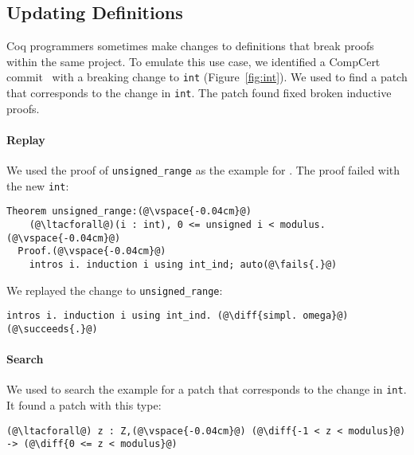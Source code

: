 \subsection{Updating Definitions}
\label{sec:compcert}

Coq programmers sometimes make changes to definitions that break proofs
within the same project. To emulate this use case, 
we identified a CompCert commit~\cite{compcertcommit}
with a breaking change to \lstinline{int} (Figure~\ref{fig:int}). %
We used \sysname to find a patch that corresponds to the change in \lstinline{int}.
The patch \sysname found fixed broken inductive proofs.

\paragraph{Replay} We used the proof of \lstinline{unsigned_range} as the example for \sysname.
The proof failed with the new \lstinline{int}:

\lstset{language=coq, aboveskip=3pt,belowskip=3pt}
\begin{lstlisting}[language=coq]
  Theorem unsigned_range:(@\vspace{-0.04cm}@)
    (@\ltacforall@)(i : int), 0 <= unsigned i < modulus.(@\vspace{-0.04cm}@)
  Proof.(@\vspace{-0.04cm}@)
    intros i. induction i using int_ind; auto(@\fails{.}@)
\end{lstlisting}

We replayed the change to \lstinline{unsigned_range}:

\begin{lstlisting}[language=coq]
    intros i. induction i using int_ind. (@\diff{simpl. omega}@)(@\succeeds{.}@)
\end{lstlisting}

\paragraph{Search} We used \sysname to search the example for a patch that corresponds to the change in \lstinline{int}. It found
a patch with this type:

\begin{lstlisting}[language=coq]
   (@\ltacforall@) z : Z,(@\vspace{-0.04cm}@) (@\diff{-1 < z < modulus}@) -> (@\diff{0 <= z < modulus}@)
\end{lstlisting}

